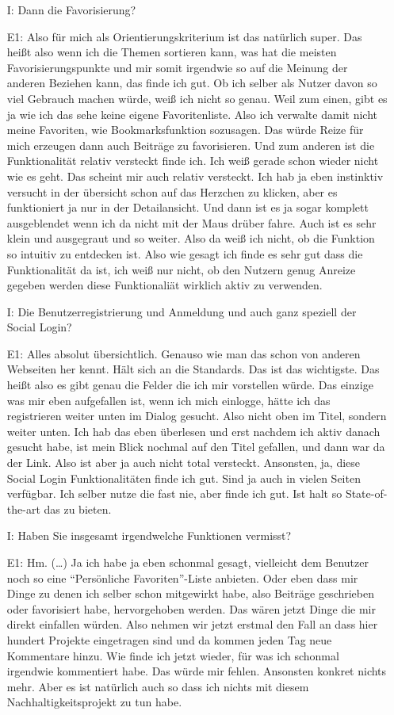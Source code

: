 \begin{itemize}
    \item[I:] Dann die Favorisierung?
    \item[E1:] Also f{\"u}r mich als Orientierungskriterium ist das nat{\"u}rlich super. Das hei{\ss}t also wenn ich die Themen sortieren kann, was hat die meisten Favorisierungspunkte und mir somit irgendwie so auf die Meinung der anderen Beziehen kann, das finde ich gut. Ob ich selber als Nutzer davon so viel Gebrauch machen w{\"u}rde, wei{\ss} ich nicht so genau. Weil zum einen, gibt es ja wie ich das sehe keine eigene Favoritenliste. Also ich verwalte damit nicht meine Favoriten, wie Bookmarksfunktion sozusagen. Das w{\"u}rde Reize f{\"u}r mich erzeugen dann auch Beitr{\"a}ge zu favorisieren. Und zum anderen ist die Funktionalit{\"a}t relativ versteckt finde ich. Ich wei{\ss} gerade schon wieder nicht wie es geht. Das scheint mir auch relativ versteckt. Ich hab ja eben instinktiv versucht in der {\"u}bersicht schon auf das Herzchen zu klicken, aber es funktioniert ja nur in der Detailansicht. Und dann ist es ja sogar komplett ausgeblendet wenn ich da nicht mit der Maus dr{\"u}ber fahre. Auch ist es sehr klein und ausgegraut und so weiter. Also da wei{\ss} ich nicht, ob die Funktion so intuitiv zu entdecken ist. Also wie gesagt ich finde es sehr gut dass die Funktionalit{\"a}t da ist, ich wei{\ss} nur nicht, ob den Nutzern genug Anreize gegeben werden diese Funktionali{\"a}t wirklich aktiv zu verwenden.
    \item[I:] Die Benutzerregistrierung und Anmeldung und auch ganz speziell der Social Login?
    \item[E1:] Alles absolut {\"u}bersichtlich. Genauso wie man das schon von anderen Webseiten her kennt. H{\"a}lt sich an die Standards. Das ist das wichtigste. Das hei{\ss}t also es gibt genau die Felder die ich mir vorstellen w{\"u}rde. Das einzige was mir eben aufgefallen ist, wenn ich mich einlogge, h{\"a}tte ich das registrieren weiter unten im Dialog gesucht. Also nicht oben im Titel, sondern weiter unten. Ich hab das eben {\"u}berlesen und erst nachdem ich aktiv danach gesucht habe, ist mein Blick nochmal auf den Titel gefallen, und dann war da der Link. Also ist aber ja auch nicht total versteckt. Ansonsten, ja, diese Social Login Funktionalit{\"a}ten finde ich gut. Sind ja auch in vielen Seiten verf{\"u}gbar. Ich selber nutze die fast nie, aber finde ich gut. Ist halt so State-of-the-art das zu bieten.
    \item[I:] Haben Sie insgesamt irgendwelche Funktionen vermisst?
    \item[E1:] Hm. (\dots) Ja ich habe ja eben schonmal gesagt, vielleicht dem Benutzer noch so eine "`Pers{\"o}nliche Favoriten"'-Liste anbieten. Oder eben dass mir Dinge zu denen ich selber schon mitgewirkt habe, also Beitr{\"a}ge geschrieben oder favorisiert habe, hervorgehoben werden. Das w{\"a}ren jetzt Dinge die mir direkt einfallen w{\"u}rden. Also nehmen wir jetzt erstmal den Fall an dass hier hundert Projekte eingetragen sind und da kommen jeden Tag neue Kommentare hinzu. Wie finde ich jetzt wieder, f{\"u}r was ich schonmal irgendwie kommentiert habe. Das w{\"u}rde mir fehlen. Ansonsten konkret nichts mehr. Aber es ist nat{\"u}rlich auch so dass ich nichts mit diesem Nachhaltigkeitsprojekt zu tun habe.

\end{itemize}
